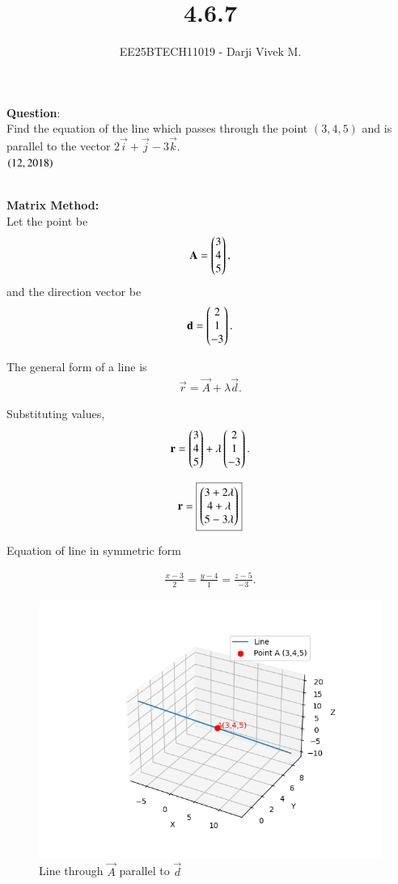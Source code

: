 \documentclass[journal]{IEEEtran}
\begin{document}


\title{4.6.7}
\author{EE25BTECH11019 - Darji Vivek M.}
{\let\newpage\relax\maketitle}

\renewcommand{\thefigure}{\theenumi}
\renewcommand{\thetable}{\theenumi}
\setlength{\intextsep}{10pt}
\renewcommand{\thetable}{\theenumi}

\textbf{Question}:\\
Find the equation of the line which passes through the point $(3,4,5)$ and is parallel to the vector $2\vec{i}+\vec{j}-3\vec{k}$.\\[4pt]
\hfill $\left(12,2018\right)$

\solution \\[-2mm]
\textbf{Matrix Method:}\\
Let the point be
\begin{align}
\mathbf{A}=\begin{pmatrix}3\\4\\5\end{pmatrix},
\end{align}
and the direction vector be
\begin{align}
\mathbf{d}=\begin{pmatrix}2\\1\\-3\end{pmatrix}.
\end{align}

The general form of a line is
\begin{align}
\vec{r}=\vec{A}+\lambda\vec{d}.
\end{align}

Substituting values,
\begin{align}
\mathbf{r}=\begin{pmatrix}3\\4\\5\end{pmatrix}+\lambda\begin{pmatrix}2\\1\\-3\end{pmatrix}.
\end{align}

\begin{align}
\mathbf{r}=\boxed{\begin{pmatrix}3+2\lambda\\4+\lambda\\5-3\lambda\end{pmatrix}}
\end{align}

Equation of line in symmetric form

\begin{align}
\frac{x-3}{2}=\frac{y-4}{1}=\frac{z-5}{-3}.
\end{align}

\begin{figure}[H]
\centering
\includegraphics[width=0.75\columnwidth]{figs/7.png}
\caption{\centering Line through $\vec{A}$ parallel to $\vec{d}$}
\label{fig:line_eqn}
\end{figure}
\end{document}
